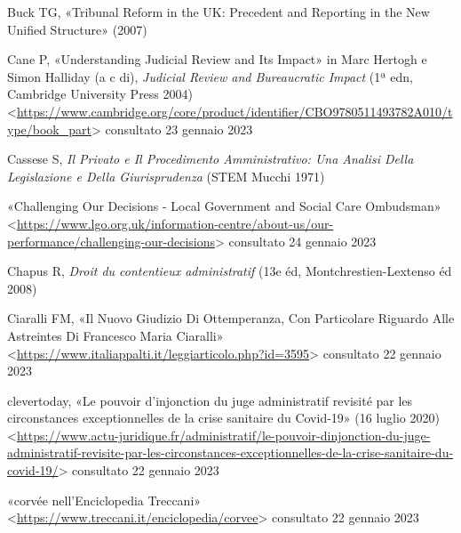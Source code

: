 \documentclass[12pt,it,a4paper,]{report}
\newlength{\cslhangindent}
\newenvironment{CSLReferences}[2] %
 {%
  \setlength{\parindent}{0pt}
  \ifodd #1 \everypar{\setlength{\hangindent}{\cslhangindent}}\ignorespaces\fi
  \ifnum #2 > 0
  \setlength{\parskip}{#2\baselineskip}
  \fi
 }%
 {}
\begin{document}
\hypertarget{refs}{}
\begin{CSLReferences}{0}{0}
\leavevmode{}%
Buck TG, {«Tribunal Reform in the {UK}: {Precedent} and Reporting in the
New Unified Structure»} (2007)

\leavevmode{}%
Cane P, {«Understanding Judicial Review and Its Impact»} in Marc Hertogh
e Simon Halliday (a c di), \emph{Judicial {Review} and {Bureaucratic
Impact}} (1ª edn, {Cambridge University Press} 2004)
\textless{}\url{https://www.cambridge.org/core/product/identifier/CBO9780511493782A010/type/book_part}\textgreater{}
consultato 23 gennaio 2023

\leavevmode{}%
Cassese S, \emph{Il Privato e Il Procedimento Amministrativo: Una
Analisi Della Legislazione e Della Giurisprudenza} ({STEM Mucchi} 1971)

\leavevmode{}%
{«Challenging Our Decisions - {Local Government} and {Social Care
Ombudsman}»}
\textless{}\url{https://www.lgo.org.uk/information-centre/about-us/our-performance/challenging-our-decisions}\textgreater{}
consultato 24 gennaio 2023

\leavevmode{}%
Chapus R, \emph{Droit du contentieux administratif} (13e éd,
{Montchrestien-Lextenso éd} 2008)

\leavevmode{}%
Ciaralli FM, {«Il Nuovo Giudizio Di Ottemperanza, Con Particolare
Riguardo Alle Astreintes Di {Francesco Maria Ciaralli}»}
\textless{}\url{https://www.italiappalti.it/leggiarticolo.php?id=3595}\textgreater{}
consultato 22 gennaio 2023

\leavevmode{}%
clevertoday, {«Le pouvoir d'injonction du juge administratif revisité
par les circonstances exceptionnelles de la crise sanitaire du
Covid-19»} (16 luglio 2020)
\textless{}\url{https://www.actu-juridique.fr/administratif/le-pouvoir-dinjonction-du-juge-administratif-revisite-par-les-circonstances-exceptionnelles-de-la-crise-sanitaire-du-covid-19/}\textgreater{}
consultato 22 gennaio 2023

\leavevmode{}%
{«corvée nell'Enciclopedia Treccani»}
\textless{}\url{https://www.treccani.it/enciclopedia/corvee}\textgreater{}
consultato 22 gennaio 2023


\end{CSLReferences}
\end{document}

